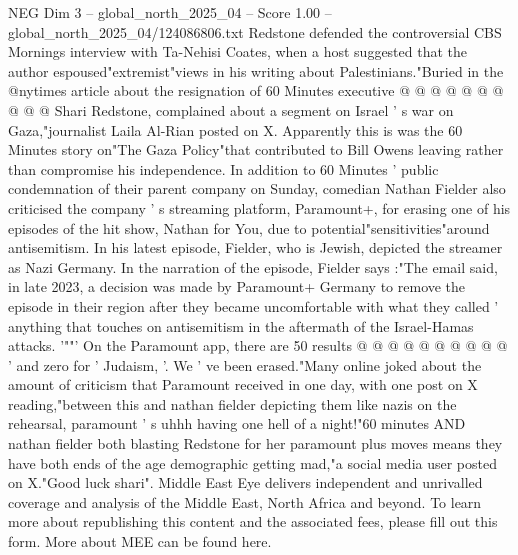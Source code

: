 \begin{textsample}{NEG Dim 3 – global\_north\_2025\_04 – Score 1.00 – global\_north\_2025\_04/124086806.txt}
Redstone defended the controversial CBS Mornings interview with Ta-Nehisi Coates, when a host suggested that the author espoused"extremist"views in his writing about Palestinians."Buried in the @nytimes article about the resignation of 60 Minutes executive @ @ @ @ @ @ @ @ @ @ Shari Redstone, complained about a segment on Israel ' s war on Gaza,"journalist Laila Al-Rian posted on X.
Apparently this is was the 60 Minutes story on"The Gaza Policy"that contributed to Bill Owens leaving rather than compromise his independence.
In addition to 60 Minutes ' public condemnation of their parent company on Sunday, comedian Nathan Fielder also criticised the company ' s streaming platform, Paramount+, for erasing one of his episodes of the hit show, Nathan for You, due to potential"sensitivities"around antisemitism.
In his latest episode, Fielder, who is Jewish, depicted the streamer as Nazi Germany.
In the narration of the episode, Fielder says :"The email said, in late 2023, a decision was made by Paramount+ Germany to remove the episode in their region after they became uncomfortable with what they called ' anything that touches on antisemitism in the aftermath of the Israel-Hamas attacks. '""' On the Paramount app, there are 50 results @ @ @ @ @ @ @ @ @ @ ' and zero for ' Judaism, '.
We ' ve been erased."Many online joked about the amount of criticism that Paramount received in one day, with one post on X reading,"between this and nathan fielder depicting them like nazis on the rehearsal, paramount ' s uhhh having one hell of a night!"60 minutes AND nathan fielder both blasting Redstone for her paramount plus moves means they have both ends of the age demographic getting mad,"a social media user posted on X."Good luck shari".
Middle East Eye delivers independent and unrivalled coverage and analysis of the Middle East, North Africa and beyond.
To learn more about republishing this content and the associated fees, please fill out this form.
More about MEE can be found here.

\end{textsample}
